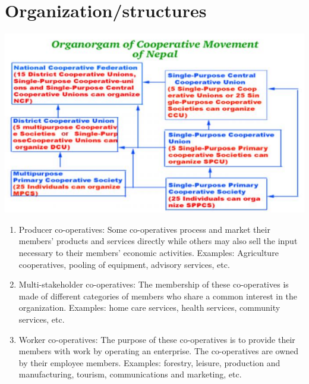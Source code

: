 \documentclass[12pt,ignorenonframetext,aspectratio=169]{beamer}
\begin{document}
\hypertarget{organizationstructures}{%
\section{Organization/structures}\label{organizationstructures}}

\begin{frame}{}
\protect\hypertarget{section-1}{}
\includegraphics[width=0.8\linewidth]{./figs/organogram_cooperative_movement}
\end{frame}

\begin{frame}{}
\protect\hypertarget{section-2}{}
\footnotesize

\begin{enumerate}
\item
  Producer co-operatives: Some co-operatives process and market their
  members' products and services directly while others may also sell the
  input necessary to their members' economic activities. Examples:
  Agriculture cooperatives, pooling of equipment, advisory services,
  etc.
\item
  Multi-stakeholder co-operatives: The membership of these co-operatives
  is made of different categories of members who share a common interest
  in the organization. Examples: home care services, health services,
  community services, etc.
\item
  Worker co-operatives: The purpose of these co-operatives is to provide
  their members with work by operating an enterprise. The co-operatives
  are owned by their employee members. Examples: forestry, leisure,
  production and manufacturing, tourism, communications and marketing,
  etc.
\end{enumerate}
\end{frame}
\end{document}
